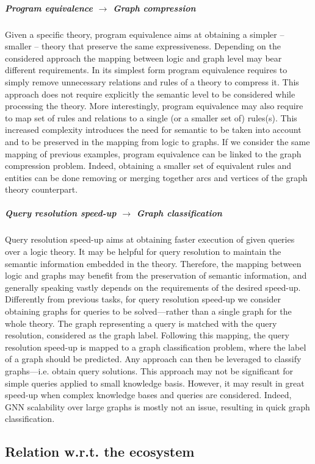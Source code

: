 \documentclass[12pt,a4paper,openright,twoside]{book}
\begin{document}
\subparagraph{Program equivalence $\rightarrow$ Graph compression}

Given a specific theory, program equivalence aims at obtaining a simpler -- smaller -- theory that preserve the same expressiveness.
%
Depending on the considered approach the mapping between logic and graph level may bear different requirements.
%
In its simplest form program equivalence requires to simply remove unnecessary relations and rules of a theory to compress it.
%
This approach does not require explicitly the semantic level to be considered while processing the theory.
%
More interestingly, program equivalence may also require to map set of rules and relations to a single (or a smaller set of) rules(s).
%
This increased complexity introduces the need for semantic to be taken into account and to be preserved in the mapping from logic to graphs.
%
If we consider the same mapping of previous examples, program equivalence can be linked to the graph compression problem.
%
Indeed, obtaining a smaller set of equivalent rules and entities can be done removing or merging together arcs and vertices of the graph theory counterpart.

\subparagraph{Query resolution speed-up $\rightarrow$ Graph classification}

Query resolution speed-up aims at obtaining faster execution of given queries over a logic theory.
%
It may be helpful for query resolution to maintain the semantic information embedded in the theory.
%
Therefore, the mapping between logic and graphs may benefit from the preservation of semantic information, and generally speaking vastly depends on the requirements of the desired speed-up.
%
Differently from previous tasks, for query resolution speed-up we consider obtaining graphs for queries to be solved---rather than a single graph for the whole theory.
%
The graph representing a query is matched with the query resolution, considered as the graph label.
%
Following this mapping, the query resolution speed-up is mapped to a graph classification problem, where the label of a graph should be predicted.
%
Any approach can then be leveraged to classify graphs---i.e. obtain query solutions.
%
This approach may not be significant for simple queries applied to small knowledge basis.
%
However, it may result in great speed-up when complex knowledge bases and queries are considered.
%
Indeed, GNN scalability over large graphs is mostly not an issue, resulting in quick graph classification.

\subsection{Relation w.r.t. the ecosystem}
\end{document}
